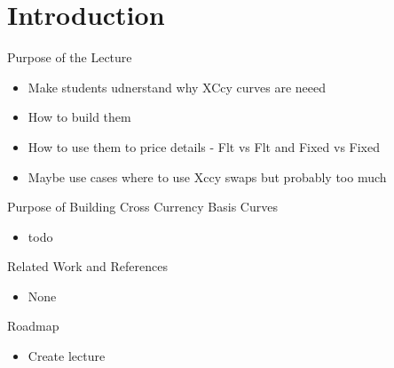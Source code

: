 \documentclass[handout, aspectratio=169]{beamer}
\subtitle{Building and Using Cross Currency Basis Curves}
\begin{document}
 



\section{Introduction}
 
\begin{frame}{Purpose of the Lecture}
	\begin{itemize}
		\item Make students udnerstand why XCcy curves are neeed
		\item How to build them
		\item How to use them to price details - Flt vs Flt and Fixed vs Fixed
		\item Maybe use cases where to use Xccy swaps but probably too much
	\end{itemize}
\end{frame}

\begin{frame}{Purpose of Building Cross Currency Basis Curves}
	\begin{itemize}
		\item todo
	\end{itemize}
\end{frame}



\begin{frame}{Related Work and References}
	\begin{itemize}	
		\item None
	\end{itemize}
\end{frame}

\begin{frame}{Roadmap}
	\begin{itemize}
	  \item Create lecture
	\end{itemize}
\end{frame}
\end{document}
